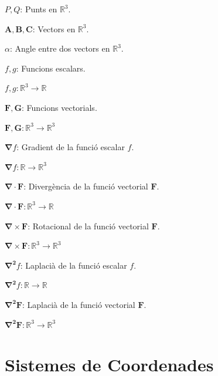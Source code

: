 \documentclass[catalan,a4paper,twoside,11pt]{article}
\begin{document}
\begin{list}{}
   \item[$P, Q$:] Punts en $\mathbb{R}^3$.

   \item[$\boldsymbol{A,B,C}$:] Vectors en $\mathbb{R}^3$.

   \item[$\alpha$:] Angle entre dos vectors en $\mathbb{R}^3$.

   \item[$f,g$:] Funcions escalars.

   $f,g \colon \mathbb{R}^3\rightarrow\mathbb{R}$

   \item[$\boldsymbol{F,G}$:] Funcions vectorials.

   $\boldsymbol{F,G}\colon\mathbb{R}^3\rightarrow\mathbb{R}^3$

   \item[$\boldsymbol{\nabla}f$:] Gradient de la funció escalar $f$.

   $\boldsymbol{\nabla}f\colon\mathbb{R}\rightarrow\mathbb{R}^3$

   \item[$\boldsymbol{\nabla\cdot F}$:] Divergència de la funció vectorial $\boldsymbol{F}$.

   $\boldsymbol{\nabla\cdot F}\colon \mathbb{R}^3\rightarrow\mathbb{R}$

   \item[$\boldsymbol{\nabla\times F}$:] Rotacional de la funció vectorial $\boldsymbol{F}$.

   $\boldsymbol{\nabla\times F}\colon   \mathbb{R}^3\rightarrow\mathbb{R}^3$

   \item[$\boldsymbol{\nabla^2}f$:] Laplacià de la funció escalar $f$.

   $\boldsymbol{\nabla^2}f\colon \mathbb{R}\rightarrow\mathbb{R}$

   \item[$\boldsymbol{\nabla^2F}$:] Laplacià de la funció vectorial $\boldsymbol{F}$.

    $\boldsymbol{\nabla^2F}\colon \mathbb{R}^3\rightarrow\mathbb{R}^3$
\end{list}

\newcommand{\va}{\ensuremath{\,\boldsymbol{\hat{x}}}}
\newcommand{\vb}{\ensuremath{\,\boldsymbol{\hat{y}}}}
\newcommand{\vc}{\ensuremath{\,\boldsymbol{\hat{z}}}}
\section{Sistemes de Coordenades}
\end{document}
